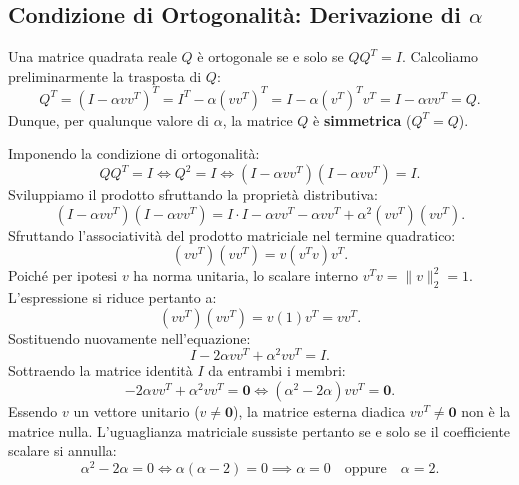 \subsection{Condizione di Ortogonalit\`a: Derivazione di $\alpha$}
Una matrice quadrata reale $Q$ \`e ortogonale se e solo se $Q Q^T = I$.
Calcoliamo preliminarmente la trasposta di $Q$:
\begin{equation}
    Q^T = (I - \alpha v v^T)^T = I^T - \alpha (v v^T)^T = I - \alpha (v^T)^T v^T = I - \alpha v v^T = Q.
\end{equation}
Dunque, per qualunque valore di $\alpha$, la matrice $Q$ \`e \textbf{simmetrica} ($Q^T = Q$).

Imponendo la condizione di ortogonalit\`a:
\begin{equation}
    Q Q^T = I \iff Q^2 = I \iff (I - \alpha v v^T)(I - \alpha v v^T) = I.
\end{equation}
Sviluppiamo il prodotto sfruttando la propriet\`a distributiva:
\begin{equation}
    (I - \alpha v v^T)(I - \alpha v v^T) = I \cdot I - \alpha v v^T - \alpha v v^T + \alpha^2 (v v^T)(v v^T).
\end{equation}
Sfruttando l'associativit\`a del prodotto matriciale nel termine quadratico:
\begin{equation}
    (v v^T)(v v^T) = v (v^T v) v^T.
\end{equation}
Poich\'e per ipotesi $v$ ha norma unitaria, lo scalare interno $v^T v = \|v\|_2^2 = 1$. L'espressione si riduce pertanto a:
\begin{equation}
    (v v^T)(v v^T) = v (1) v^T = v v^T.
\end{equation}
Sostituendo nuovamente nell'equazione:
\begin{equation}
    I - 2\alpha v v^T + \alpha^2 v v^T = I.
\end{equation}
Sottraendo la matrice identit\`a $I$ da entrambi i membri:
\begin{equation}
    -2\alpha v v^T + \alpha^2 v v^T = \mathbf{0} \iff (\alpha^2 - 2\alpha) v v^T = \mathbf{0}.
\end{equation}
Essendo $v$ un vettore unitario ($v \neq \mathbf{0}$), la matrice esterna diadica $v v^T \neq \mathbf{0}$ non \`e la matrice nulla. L'uguaglianza matriciale sussiste pertanto se e solo se il coefficiente scalare si annulla:
\begin{equation}
    \alpha^2 - 2\alpha = 0 \iff \alpha(\alpha - 2) = 0 \implies \alpha = 0 \quad \text{oppure} \quad \alpha = 2.
\end{equation}

